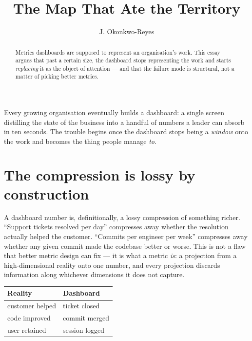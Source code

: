 \documentclass{tufte-handout}
\title{The Map That Ate the Territory}
\author{J. Okonkwo-Reyes}
\date{}
\begin{document}
\maketitle

\begin{abstract}
Metrics dashboards are supposed to represent an organisation's work.
This essay argues that past a certain size, the dashboard stops
representing the work and starts \emph{replacing} it as the object of
attention --- and that the failure mode is structural, not a matter
of picking better metrics.
\end{abstract}

Every growing organisation eventually builds a dashboard: a single
screen distilling the state of the business into a handful of
numbers a leader can absorb in ten seconds. The trouble begins once the dashboard stops being a
\emph{window} onto the work and becomes the thing people manage
\emph{to}.

\section{The compression is lossy by construction}

A dashboard number is, definitionally, a lossy compression of
something richer. ``Support tickets resolved per day'' compresses
away whether the resolution actually helped the customer. ``Commits
per engineer per week'' compresses away whether any given commit made
the codebase better or worse. This is not a flaw that better metric
design can fix --- it is what a metric \emph{is}: a projection from a
high-dimensional reality onto one number, and every projection
discards information along whichever dimensions it does not
capture.

\begin{marginfigure}
\begin{tabular}{ll}
\toprule
\textbf{Reality} & \textbf{Dashboard} \\
\midrule
customer helped & ticket closed \\
code improved & commit merged \\
user retained & session logged \\
\bottomrule
\end{tabular}
\caption{Each dashboard column discards everything in its row except
the one thing it counts.}
\end{marginfigure}
\end{document}
